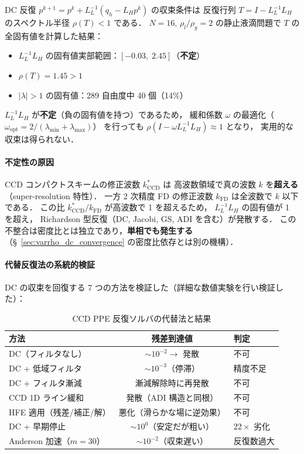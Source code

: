 DC 反復 $p^{k+1} = p^k + L_L^{-1}(q_h - L_H p^k)$ の収束条件は
反復行列 $T = I - L_L^{-1} L_H$ のスペクトル半径 $\rho(T) < 1$ である．
$N = 16$, $\rho_l/\rho_g = 2$ の静止液滴問題で $T$ の全固有値を計算した結果：
\begin{itemize}[noitemsep]
  \item $L_L^{-1} L_H$ の固有値実部範囲：$[-0.03,\; 2.45]$（\textbf{不定}）
  \item $\rho(T) = 1.45 > 1$
  \item $|\lambda| > 1$ の固有値：289 自由度中 40 個（14\%）
\end{itemize}
$L_L^{-1} L_H$ が\textbf{不定}（負の固有値を持つ）であるため，
緩和係数 $\omega$ の最適化（$\omega_{\mathrm{opt}} = 2/(\lambda_{\min}+\lambda_{\max})$）
を行っても $\rho(I - \omega L_L^{-1} L_H) \approx 1$ となり，
実用的な収束は得られない．

\paragraph{不定性の原因}

CCD コンパクトスキームの修正波数 $k^*_{\mathrm{CCD}}$ は
高波数領域で真の波数 $k$ を\textbf{超える}（super-resolution 特性）．
一方 2 次精度 FD の修正波数 $k_{\mathrm{FD}}$ は全波数で $k$ 以下である．
この比 $k^*_{\mathrm{CCD}} / k_{\mathrm{FD}}$ が高波数で 1 を超えるため，
$L_L^{-1} L_H$ の固有値が 1 を超え，
Richardson 型反復（DC, Jacobi, GS, ADI を含む）が発散する．
この不整合は密度比とは独立であり，\textbf{単相でも発生する}
（§~\ref{sec:varrho_dc_convergence} の密度比依存とは別の機構）．

\paragraph{代替反復法の系統的検証}

DC の収束を回復する 7 つの方法を検証した（詳細な数値実験を行い検証した）：

\begin{table}[htbp]
\centering
\caption{CCD PPE 反復ソルバの代替法と結果}
\label{tab:dc_alternatives}
\renewcommand{\arraystretch}{1.3}
\begin{tabular}{>{\raggedright\arraybackslash}p{40mm}cl}
\toprule
方法 & 残差到達値 & 判定 \\
\midrule
DC（フィルタなし）        & $\sim 10^{-2} \to$ 発散  & 不可 \\
DC + 低域フィルタ          & $\sim 10^{-3}$（停滞）   & 精度不足 \\
DC + フィルタ漸減          & 漸減解除時に再発散        & 不可 \\
CCD 1D ライン緩和          & 発散（ADI 構造と同根）   & 不可 \\
HFE 適用（残差/補正/解）   & 悪化（滑らかな場に逆効果）& 不可 \\
DC + 早期停止               & $\sim 10^{0}$（安定だが粗い）& $22\times$ 劣化 \\
Anderson 加速（$m{=}30$）  & $\sim 10^{-2}$（収束遅い）& 反復数過大 \\
\bottomrule
\end{tabular}
\end{table}

